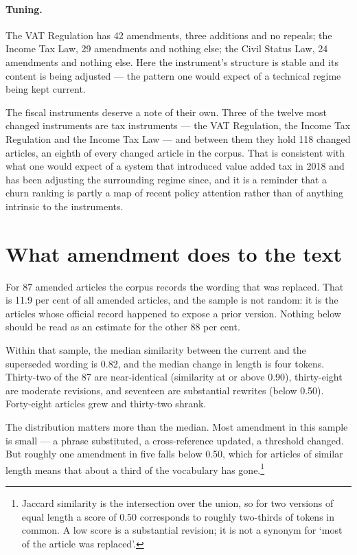 \documentclass[11pt]{article}
\begin{document}
\paragraph{Tuning.} The VAT Regulation has 42 amendments, three additions and
no repeals; the Income Tax Law, 29 amendments and nothing else; the Civil
Status Law, 24 amendments and nothing else. Here the instrument's structure is
stable and its content is being adjusted --- the pattern one would expect of a
technical regime being kept current.

The fiscal instruments deserve a note of their own. Three of the twelve most
changed instruments are tax instruments --- the VAT Regulation, the Income Tax
Regulation and the Income Tax Law --- and between them they hold 118 changed
articles, an eighth of every changed article in the corpus. That is consistent with what one would expect of a system
that introduced value added tax in 2018 and has been adjusting the surrounding
regime since, and it is a reminder that a churn ranking is partly a map of
recent policy attention rather than of anything intrinsic to the instruments.

\section{What amendment does to the text}
\label{sec:magnitude}

For 87 amended articles the corpus records the wording that was replaced. That
is 11.9 per cent of all amended articles, and the sample is not random: it is
the articles whose official record happened to expose a prior version. Nothing
below should be read as an estimate for the other 88 per cent.

Within that sample, the median similarity between the current and the
superseded wording is 0.82, and the median change in length is four tokens.
Thirty-two of the 87 are near-identical (similarity at or above 0.90),
thirty-eight are moderate revisions, and seventeen are substantial rewrites
(below 0.50). Forty-eight articles grew and thirty-two shrank.

The distribution matters more than the median. Most amendment in this sample
is small --- a phrase substituted, a cross-reference updated, a threshold
changed. But roughly one amendment in five falls below 0.50, which for
articles of similar length means that about a third of the vocabulary has
gone.\footnote{Jaccard similarity is the intersection over the union, so for
two versions of equal length a score of 0.50 corresponds to roughly two-thirds
of tokens in common. A low score is a substantial revision; it is not a
synonym for `most of the article was replaced'.}
\end{document}
